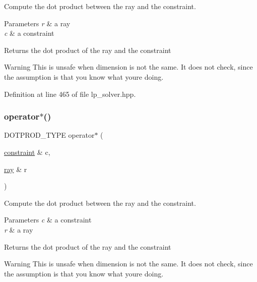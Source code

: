 Compute the dot product between the ray and the constraint. 


\begin{DoxyParams}{Parameters}
{\em r} & a ray \\
\hline
{\em c} & a constraint \\
\hline
\end{DoxyParams}
\begin{DoxyReturn}{Returns}
the dot product of the ray and the constraint 
\end{DoxyReturn}
\begin{DoxyWarning}{Warning}
This is unsafe when dimension is not the same. It does not check, since the assumption is that you know what you\textquotesingle{}re doing. 
\end{DoxyWarning}


Definition at line 465 of file lp\+\_\+solver.\+hpp.

\mbox{\label{group___c_l_s_solvers_ga240d91c518c3bfe3817504de43039022}} 
\subsubsection{\texorpdfstring{operator$\ast$()}{operator*()}\hspace{0.1cm}{\footnotesize\ttfamily [4/4]}}
{\footnotesize\ttfamily D\+O\+T\+P\+R\+O\+D\+\_\+\+T\+Y\+PE operator$\ast$ (\begin{DoxyParamCaption}\item[{\hyperlink{group___c_l_s_solvers_classconstraint}{constraint} \&}]{c,  }\item[{\hyperlink{group___c_l_s_solvers_classray}{ray} \&}]{r }\end{DoxyParamCaption})\hspace{0.3cm}{\ttfamily [inline]}}



Compute the dot product between the ray and the constraint. 


\begin{DoxyParams}{Parameters}
{\em c} & a constraint \\
\hline
{\em r} & a ray \\
\hline
\end{DoxyParams}
\begin{DoxyReturn}{Returns}
the dot product of the ray and the constraint 
\end{DoxyReturn}
\begin{DoxyWarning}{Warning}
This is unsafe when dimension is not the same. It does not check, since the assumption is that you know what you\textquotesingle{}re doing. 
\end{DoxyWarning}


